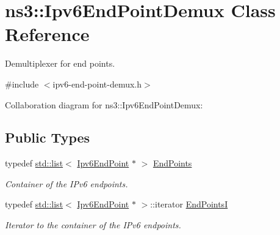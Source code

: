 \hypertarget{classns3_1_1Ipv6EndPointDemux}{}\section{ns3\+:\+:Ipv6\+End\+Point\+Demux Class Reference}
\label{classns3_1_1Ipv6EndPointDemux}


Demultiplexer for end points.  




{\ttfamily \#include $<$ipv6-\/end-\/point-\/demux.\+h$>$}



Collaboration diagram for ns3\+:\+:Ipv6\+End\+Point\+Demux\+:
\subsection*{Public Types}
\begin{DoxyCompactItemize}
\item 
typedef \hyperlink{openflow-interface_8h_afd9bcfa176617760671b67580f536fa7}{std\+::list}$<$ \hyperlink{classns3_1_1Ipv6EndPoint}{Ipv6\+End\+Point} $\ast$ $>$ \hyperlink{classns3_1_1Ipv6EndPointDemux_a40c1d59189759e1e7f5cabe7cd01c0fa}{End\+Points}
\begin{DoxyCompactList}\small\item\em Container of the I\+Pv6 endpoints. \end{DoxyCompactList}\item 
typedef \hyperlink{openflow-interface_8h_afd9bcfa176617760671b67580f536fa7}{std\+::list}$<$ \hyperlink{classns3_1_1Ipv6EndPoint}{Ipv6\+End\+Point} $\ast$ $>$\+::iterator \hyperlink{classns3_1_1Ipv6EndPointDemux_a79d7b69805dbd45a902e5e6b375e752b}{End\+PointsI}
\begin{DoxyCompactList}\small\item\em Iterator to the container of the I\+Pv6 endpoints. \end{DoxyCompactList}\end{DoxyCompactItemize}
